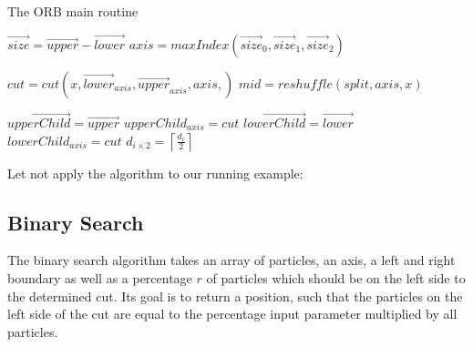 \documentclass[]{article}
\begin{document}
\begin{algorithm}[H]
	\caption{The ORB main routine}\label{euclid}
	\begin{algorithmic}[1]
		\State $\vec{size} = \vec{upper} - \vec{lower}$
		\State $axis = maxIndex(\vec{size}_0, \vec{size}_1, \vec{size}_2)$ 
		\newline
		
		\State $cut = cut(x, \vec{lower}_{axis}, \vec{upper}_{axis}, axis, )$
		\State $mid = reshuffle(split, axis, x)$
		\newline
		
		\State $\vec{upperChild} = \vec{upper}$
		\State $upperChild_{axis} = cut$
		\State $\vec{lowerChild} = \vec{lower}$
		\State $lowerChild_{axis} = cut$
		\State $d_{i \times 2 } = \left \lceil\frac{d_{i}}{2} \right \rceil$
		\State {}
		\EndProcedure
	\end{algorithmic}
\end{algorithm}

Let not apply the algorithm to our running example:


\subsection{Binary Search}



 The binary search algorithm takes an array of particles, an axis, a left and right boundary as well as a percentage $r$ of particles which should be on the left side to the determined cut. Its goal is to return a position, such that the particles on the left side of the cut are equal to the percentage input parameter multiplied by all particles.
 
\end{document}
